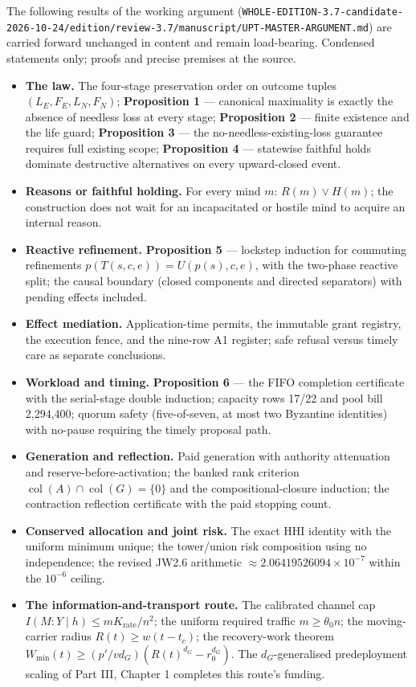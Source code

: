 \documentclass[
]{article}
\providecommand{\tightlist}{%
  \setlength{\itemsep}{0pt}\setlength{\parskip}{0pt}}
\begin{document}
The following results of the working argument
(\texttt{WHOLE-EDITION-3.7-candidate-2026-10-24/edition/review-3.7/manuscript/UPT-MASTER-ARGUMENT.md})
are carried forward unchanged in content and remain load-bearing.
Condensed statements only; proofs and precise premises at the source.

\begin{itemize}
\tightlist
\item
  \textbf{The law.} The four-stage preservation order on outcome tuples
  \((L_E,F_E,L_N,F_N)\); \textbf{Proposition 1} --- canonical maximality
  is exactly the absence of needless loss at every stage;
  \textbf{Proposition 2} --- finite existence and the life guard;
  \textbf{Proposition 3} --- the no-needless-existing-loss guarantee
  requires full existing scope; \textbf{Proposition 4} --- statewise
  faithful holds dominate destructive alternatives on every
  upward-closed event.
\item
  \textbf{Reasons or faithful holding.} For every mind \(m\):
  \(R(m)\lor H(m)\); the construction does not wait for an incapacitated
  or hostile mind to acquire an internal reason.
\item
  \textbf{Reactive refinement.} \textbf{Proposition 5} --- lockstep
  induction for commuting refinements \(p(T(s,c,e))=U(p(s),c,e)\), with
  the two-phase reactive split; the causal boundary (closed components
  and directed separators) with pending effects included.
\item
  \textbf{Effect mediation.} Application-time permits, the immutable
  grant registry, the execution fence, and the nine-row A1 register;
  safe refusal versus timely care as separate conclusions.
\item
  \textbf{Workload and timing.} \textbf{Proposition 6} --- the FIFO
  completion certificate with the serial-stage double induction;
  capacity rows 17/22 and pool bill 2,294,400; quorum safety
  (five-of-seven, at most two Byzantine identities) with no-pause
  requiring the timely proposal path.
\item
  \textbf{Generation and reflection.} Paid generation with authority
  attenuation and reserve-before-activation; the banked rank criterion
  \(\operatorname{col}(A)\cap\operatorname{col}(G)=\{0\}\) and the
  compositional-closure induction; the contraction reflection
  certificate with the paid stopping count.
\item
  \textbf{Conserved allocation and joint risk.} The exact HHI identity
  with the uniform minimum unique; the tower/union risk composition
  using no independence; the revised JW2.6 arithmetic
  \(\approx2.06419526094\times10^{-7}\) within the \(10^{-6}\) ceiling.
\item
  \textbf{The information-and-transport route.} The calibrated channel
  cap \(I(M:Y\mid h)\le mK_{\mathrm{rate}}/n^2\); the uniform required
  traffic \(m\ge\theta_0n\); the moving-carrier radius
  \(R(t)\ge w(t-t_c)\); the recovery-work theorem
  \(W_{\min}(t)\ge(p'/vd_G)(R(t)^{d_G}-r_0^{d_G})\). The
  \(d_G\)-generalised predeployment scaling of Part III, Chapter 1
  completes this route's funding.
\end{itemize}
\end{document}
